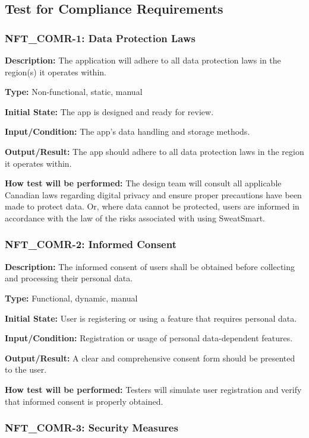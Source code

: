 \documentclass[12pt, titlepage]{article}
\begin{document}
\subsection{Test for Compliance Requirements}


\subsubsection*{\textbf{NFT\_COMR-1: Data Protection Laws}
}

\textbf{Description: }The application will adhere to all data protection laws in the region(s) it operates within.

\textbf{Type:} Non-functional, static, manual

\textbf{Initial State:} The app is designed and ready for review.

\textbf{Input/Condition:} The app's data handling and storage methods.

\textbf{Output/Result:} The app should adhere to all data protection laws in the region it operates within.

\textbf{How test will be performed:} The design team will consult all applicable Canadian laws regarding digital privacy and ensure proper precautions have been made to protect data. Or, where data cannot be protected, users are informed in accordance with the law of the risks associated with using SweatSmart. 


\subsubsection*{\textbf{NFT\_COMR-2: Informed Consent}
}

\textbf{Description: }The informed consent of users shall be obtained before collecting and processing their personal data.

\textbf{Type:} Functional, dynamic, manual

\textbf{Initial State:} User is registering or using a feature that requires personal data.

\textbf{Input/Condition:} Registration or usage of personal data-dependent features.

\textbf{Output/Result:} A clear and comprehensive consent form should be presented to the user.

\textbf{How test will be performed:} Testers will simulate user registration and verify that informed consent is properly obtained.


\subsubsection*{\textbf{NFT\_COMR-3: Security Measures}
}
\end{document}
